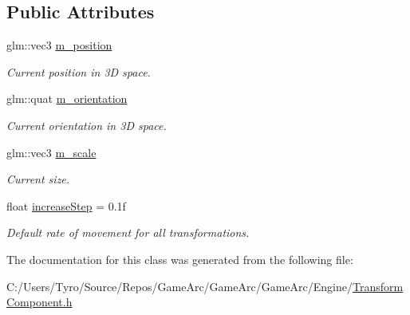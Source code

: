 \subsection*{Public Attributes}
\begin{DoxyCompactItemize}
\item 
\mbox{\label{class_transform_component_a5a441b52ff5f18d940e3351e35868481}} 
glm\+::vec3 \mbox{\hyperlink{class_transform_component_a5a441b52ff5f18d940e3351e35868481}{m\+\_\+position}}
\begin{DoxyCompactList}\small\item\em Current position in 3D space. \end{DoxyCompactList}\item 
\mbox{\label{class_transform_component_a70f27f66f621e0e52e96e40ec168ede2}} 
glm\+::quat \mbox{\hyperlink{class_transform_component_a70f27f66f621e0e52e96e40ec168ede2}{m\+\_\+orientation}}
\begin{DoxyCompactList}\small\item\em Current orientation in 3D space. \end{DoxyCompactList}\item 
\mbox{\label{class_transform_component_a50d168d6290b29a66b21ce576fa44d59}} 
glm\+::vec3 \mbox{\hyperlink{class_transform_component_a50d168d6290b29a66b21ce576fa44d59}{m\+\_\+scale}}
\begin{DoxyCompactList}\small\item\em Current size. \end{DoxyCompactList}\item 
\mbox{\label{class_transform_component_a86cf1deb8c126b29155bc415bfa4d75f}} 
float \mbox{\hyperlink{class_transform_component_a86cf1deb8c126b29155bc415bfa4d75f}{increase\+Step}} = 0.\+1f
\begin{DoxyCompactList}\small\item\em Default rate of movement for all transformations. \end{DoxyCompactList}\end{DoxyCompactItemize}


The documentation for this class was generated from the following file\+:\begin{DoxyCompactItemize}
\item 
C\+:/\+Users/\+Tyro/\+Source/\+Repos/\+Game\+Arc/\+Game\+Arc/\+Game\+Arc/\+Engine/\mbox{\hyperlink{_transform_component_8h}{Transform\+Component.\+h}}\end{DoxyCompactItemize}
